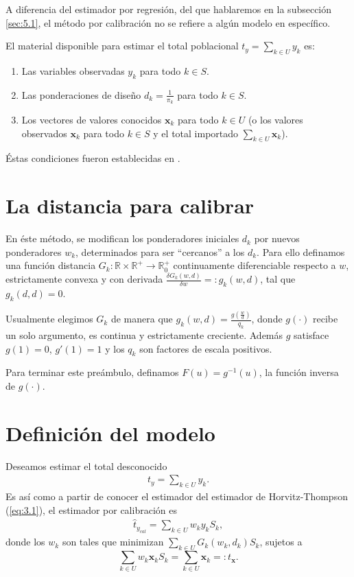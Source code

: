 \documentclass[a4paper,twoside,openright,12pt]{book}
\theoremstyle{definition}
\newcommand\pref[1]{(\ref{#1})}
\numberwithin{equation}{chapter}
\numberwithin{figure}{chapter}
\numberwithin{table}{chapter}
\numberwithin{theorem}{chapter}
\numberwithin{lemma}{chapter}
\begin{document}
A diferencia del estimador por regresión, del que hablaremos en la subsección \ref{sec:5.1}, el método por calibración no se refiere a algún modelo en específico.

El material disponible para estimar el total poblacional $t_y=\sum_{k\in U} y_k$ es:
\begin{enumerate}
	\item Las variables observadas $y_k$ para todo $k\in S$.
	\item Las ponderaciones de diseño $d_k=\frac{1}{\pi_k}$ para todo $k\in S$.
	\item Los vectores de valores conocidos $\mathbf x_k$ para todo $k\in U$ (o los valores observados $\mathbf x_k$ para todo $k\in S$ y el total importado $\sum_{k\in U} \mathbf x_k$).
\end{enumerate}
Éstas condiciones fueron establecidas en \cite{CIS-106196}.
\section{La distancia para calibrar}\label{sec:4.1}
En éste método, se modifican los ponderadores iniciales $d_k$ por nuevos ponderadores $w_k$, determinados para ser ``cercanos'' a los $d_k$. Para ello definamos una función distancia $G_k:\mathbb{R}\times \mathbb{R}^{+}\rightarrow \mathbb{R}^{+}_{0}$ continuamente diferenciable respecto a $w$, estrictamente convexa y con derivada $\frac{\delta G_k(w,d)}{\delta w}=:g_k(w,d)$, tal que $g_k(d,d)=0$.

Usualmente elegimos $G_k$ de manera que $g_k(w,d)=\frac{g\left(\frac{w}{d}\right)}{q_k}$, donde $g(\cdot)$ recibe un solo argumento, es continua y estrictamente creciente. Además $g$ satisface $g(1)=0$, $g'(1)=1$ y los $q_k$ son factores de escala positivos.

Para terminar este preámbulo, definamos $F(u)=g^{-1}(u)$, la función inversa de $g(\cdot)$.
\section{Definición del modelo}
Deseamos estimar el total desconocido
\begin{align}\label{eq:4.1}
	t_y=\sum_{k\in U}y_k.
\end{align}
Es así como a partir de conocer el estimador del estimador de Horvitz-Thompson \pref{eq:3.1}, el estimador por calibración es
\begin{align}\label{eq:4.c}
	\hat t_{y_{cal}}=\sum_{k\in U} w_k y_kS_k,
\end{align}
donde los $w_k$ son tales que minimizan $\sum_{k\in U}G_k(w_k,d_k)S_k$,
sujetos a 
$$\sum_{k\in U} w_k \mathbf{x}_kS_k=\sum_{k\in U}\mathbf{x}_k=:t_{\mathbf{x}}.$$
\end{document}
